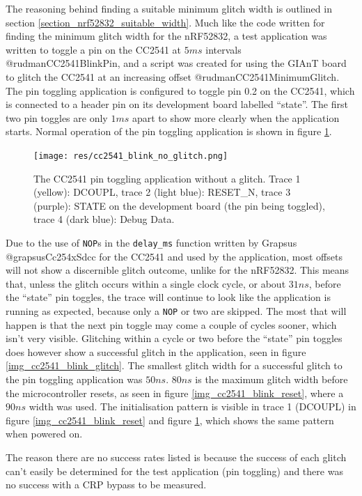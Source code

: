 The reasoning behind finding a suitable minimum glitch width is outlined
in section \ref{section_nrf52832_suitable_width}. Much like the code
written for finding the minimum glitch width for the nRF52832, a test
application was written to toggle a pin on the CC2541 at \(5ms\)
intervals @rudmanCC2541BlinkPin, and a script was created for using the
GIAnT board to glitch the CC2541 at an increasing offset
@rudmanCC2541MinimumGlitch. The pin toggling application is configured
to toggle pin 0.2 on the CC2541, which is connected to a header pin on
its development board labelled ``state''. The first two pin toggles are
only \(1ms\) apart to show more clearly when the application starts.
Normal operation of the pin toggling application is shown in figure
\ref{img_cc2541_blink_no_glitch}.

\begin{figure}
\centering
\texttt{[image: res/cc2541\_blink\_no\_glitch.png]}
\caption{The CC2541 pin toggling application without a glitch. Trace 1
(yellow): DCOUPL, trace 2 (light blue): RESET\_N, trace 3 (purple):
STATE on the development board (the pin being toggled), trace 4 (dark
blue): Debug Data. \label{img_cc2541_blink_no_glitch}}
\end{figure}

Due to the use of \texttt{NOP}s in the \texttt{delay\_ms} function
written by Grapsus @grapsusCc254xSdcc for the CC2541 and used by the
application, most offsets will not show a discernible glitch outcome,
unlike for the nRF52832. This means that, unless the glitch occurs
within a single clock cycle, or about \(31ns\), before the ``state'' pin
toggles, the trace will continue to look like the application is running
as expected, because only a \texttt{NOP} or two are skipped. The most
that will happen is that the next pin toggle may come a couple of cycles
sooner, which isn't very visible. Glitching within a cycle or two before
the ``state'' pin toggles does however show a successful glitch in the
application, seen in figure \ref{img_cc2541_blink_glitch}. The smallest
glitch width for a successful glitch to the pin toggling application was
\(50ns\). \(80ns\) is the maximum glitch width before the
microcontroller resets, as seen in figure \ref{img_cc2541_blink_reset},
where a \(90ns\) width was used. The initialisation pattern is visible
in trace 1 (DCOUPL) in figure \ref{img_cc2541_blink_reset} and figure
\ref{img_cc2541_blink_no_glitch}, which shows the same pattern when
powered on.

The reason there are no success rates listed is because the success of
each glitch can't easily be determined for the test application (pin
toggling) and there was no success with a CRP bypass to be measured.

